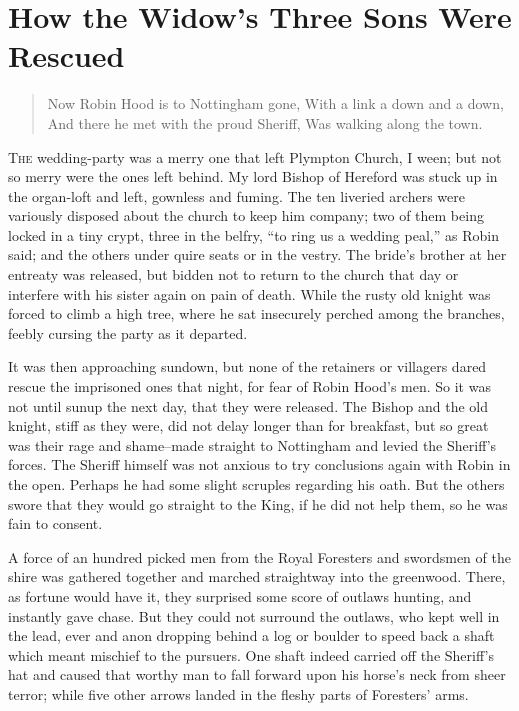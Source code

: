 \chapter{How the Widow’s Three Sons Were Rescued}

\begin{quote}
Now Robin Hood is to Nottingham gone,
With a link a down and a down,
And there he met with the proud Sheriff,
Was walking along the town.
\end{quote}

\lettrine{T}{he} wedding-party was a merry one that left Plympton Church, I ween; but
not so merry were the ones left behind. My lord Bishop of Hereford was
stuck up in the organ-loft and left, gownless and fuming. The ten
liveried archers were variously disposed about the church to keep him
company; two of them being locked in a tiny crypt, three in the belfry,
``to ring us a wedding peal,'' as Robin said; and the others under quire
seats or in the vestry. The bride's brother at her entreaty was
released, but bidden not to return to the church that day or interfere
with his sister again on pain of death. While the rusty old knight was
forced to climb a high tree, where he sat insecurely perched among the
branches, feebly cursing the party as it departed.

It was then approaching sundown, but none of the retainers or villagers
dared rescue the imprisoned ones that night, for fear of Robin Hood's
men. So it was not until sunup the next day, that they were released.
The Bishop and the old knight, stiff as they were, did not delay longer
than for breakfast, but so great was their rage and shame--made straight
to Nottingham and levied the Sheriff's forces. The Sheriff himself was
not anxious to try conclusions again with Robin in the open. Perhaps he
had some slight scruples regarding his oath. But the others swore that
they would go straight to the King, if he did not help them, so he was
fain to consent.

A force of an hundred picked men from the Royal Foresters and swordsmen
of the shire was gathered together and marched straightway into the
greenwood. There, as fortune would have it, they surprised some score of
outlaws hunting, and instantly gave chase. But they could not surround
the outlaws, who kept well in the lead, ever and anon dropping behind a
log or boulder to speed back a shaft which meant mischief to the
pursuers. One shaft indeed carried off the Sheriff's hat and caused that
worthy man to fall forward upon his horse's neck from sheer terror;
while five other arrows landed in the fleshy parts of Foresters' arms.

